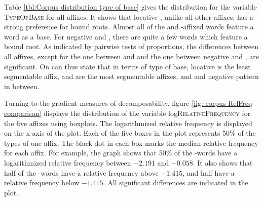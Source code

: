 Table \ref{tbl:Corpus distribution type of base} gives the distribution for the variable \textsc{TypeOfBase} for all affixes. It shows that locative , unlike all other affixes, has a strong preference for bound roots. Almost all of the  and -affixed words feature a word as a base. For negative  and , there are quite a few words which feature a bound root. As indicated by pairwise tests of proportions, the differences between all affixes, except for the one between  and  and the one between negative  and , are significant. On can thus state that in terms of type of base, locative  is the least segmentable affix,  and  are the most segmentable affixes, and  and negative  pattern in between.

\begin{table}[H]
	\caption{Type of base by affix}
	\label{tbl:Corpus distribution type of base}
	\begin{center}
\vspace*{-0.2cm}
	\end{center}
\end{table}



Turning to the gradient measures of decomposability, figure \ref{fig: corpus RelFreq comparison} displays the distribution of the variable log\textsc{RelativeFrequency} 
for the five affixes using boxplots. The logarithmized relative frequency is displayed on the x-axis of the plot.  Each of the five boxes in the plot represents 50\% of the types of one affix.  The black dot in each box marks the median relative frequency for each affix. For example, the graph shows that 50\% of the -words have a logarithmized relative frequency between $-2.191$ and $-0.058$. It also shows that half of the -words have a relative frequency above $-1.415$, and half have a relative frequency below $-1.415$. All significant differences are indicated in the plot.



